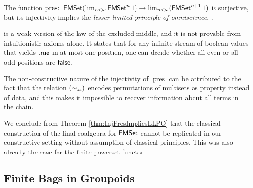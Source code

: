 \documentclass{easychair}
\begin{document}
  \begin{theorem}\label{thm:InjPresImpliesLLPO}
    The function 
        $\operatorname{pres}\colon
            \operatorname{\mathsf{FMSet}} (\lim_{n < \omega} \operatorname{\mathsf{FMSet}}^n 1)
            \to
            \lim_{n < \omega} (\operatorname{\mathsf{FMSet}}^{n+1} 1)$
    is surjective,
    but its injectivity implies the \emph{lesser limited principle of omniscience}, \LLPO.
  \end{theorem}
  \LLPO{} \cite[{Ch.\@ 1}]{Bridges1987} is a weak version of the law
  of the excluded middle, and it is not provable from intuitionistic
  axioms alone.  It states that for any infinite stream of boolean
  values that yields $\mathsf{true}$ in at most one position, one can decide
  whether all even or all odd positions are $\mathsf{false}$.

  The non-constructive nature of the injectivity of
  $\operatorname{pres}$ can be attributed to the fact that the
  relation $(\SymmetricAction{\Var{sz}}[][])$ encodes permutations of
  multisets as property instead of data, and this makes it impossible
  to recover information about all terms in the chain.

  We conclude from Theorem \ref{thm:InjPresImpliesLLPO} that the
  classical construction of the final coalgebra for $\operatorname{\mathsf{FMSet}}$ cannot be
  replicated in our constructive setting without assumption of
  classical principles. This was also already the case for the finite
  powerset functor \cite{Veltri2021}.

  \subsection*{Finite Bags in Groupoids}
\end{document}
